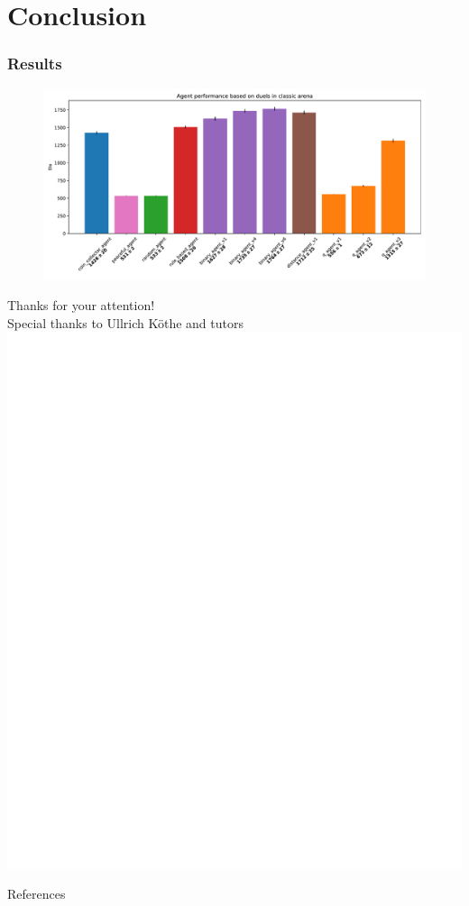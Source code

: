 \documentclass{beamer}
\begin{document}
\section{Conclusion}

\begin{frame}[fragile]
	\frametitle{Results}
	\pause

	\begin{figure}[t]
			\centering
			\includegraphics[width=1\linewidth]{elo.pdf}
	\end{figure}
\end{frame}


\begin{frame}[focus]
	Thanks for your attention!\\[0.2em]
	\small Special thanks to Ullrich Köthe and tutors\\[1.5em]
	\includegraphics[scale=0.27]{xkcd.pdf}
\end{frame}

\appendix
\begin{frame}{References}
	\nocite{*}
	
	
\end{frame}
\end{document}
